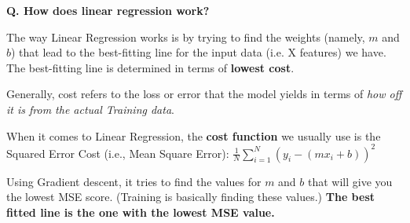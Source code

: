 \begin{frame}[fragile]{\textbf{Q. How does linear regression work?}}
  \begin{wideitemize}
  \item The way Linear Regression works is by trying to find the weights (namely, $m$ and $b$)
  that lead to the best-fitting line for the input data (i.e. X features) we have.
  The best-fitting line is determined in terms of \textbf{lowest cost}.\medskip
  \begin{wideitemize}
    \item Generally, cost refers to the loss or error that the model yields in terms
    of \textit{how off it is from the actual Training data}.
    \item When it comes to Linear Regression, the \textbf{cost function} we usually
    use is the Squared Error Cost (i.e., Mean Square Error):
    $\frac{1}{N} \sum_{i=1}^N (y_{i}-(mx_{i} + b))^2$
    \item Using Gradient descent, it tries to find the values for $m$ and $b$
      that will give you the lowest MSE score. (Training is basically finding
      these values.) \textbf{The best fitted line is the one with the lowest MSE value.}
  \end{wideitemize}
  \end{wideitemize}
\end{frame}



